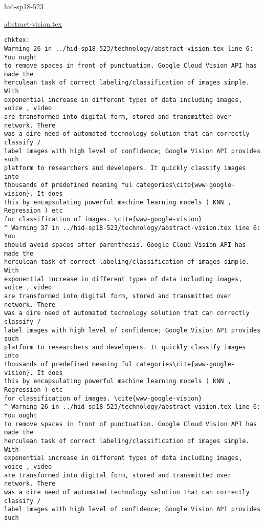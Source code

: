 \begin{IU}

hid-sp18-523

\href{https://github.com/cloudmesh-community/hid-sp18-523/blob/master//technology/abstract-vision.tex}{abstract-vision.tex}

\begin{tiny}
\begin{verbatim}
chktex:
Warning 26 in ../hid-sp18-523/technology/abstract-vision.tex line 6: You ought
to remove spaces in front of punctuation. Google Cloud Vision API has made the
herculean task of correct labeling/classification of images simple. With
exponential increase in different types of data including images, voice , video
are transformed into digital form, stored and transmitted over network. There
was a dire need of automated technology solution that can correctly classify /
label images with high level of confidence; Google Vision API provides such
platform to researchers and developers. It quickly classify images into
thousands of predefined meaning ful categories\cite{www-google-vision}. It does
this by encapsulating powerful machine learning models ( KNN , Regression ) etc
for classification of images. \cite{www-google-vision}
^ Warning 37 in ../hid-sp18-523/technology/abstract-vision.tex line 6: You
should avoid spaces after parenthesis. Google Cloud Vision API has made the
herculean task of correct labeling/classification of images simple. With
exponential increase in different types of data including images, voice , video
are transformed into digital form, stored and transmitted over network. There
was a dire need of automated technology solution that can correctly classify /
label images with high level of confidence; Google Vision API provides such
platform to researchers and developers. It quickly classify images into
thousands of predefined meaning ful categories\cite{www-google-vision}. It does
this by encapsulating powerful machine learning models ( KNN , Regression ) etc
for classification of images. \cite{www-google-vision}
^ Warning 26 in ../hid-sp18-523/technology/abstract-vision.tex line 6: You ought
to remove spaces in front of punctuation. Google Cloud Vision API has made the
herculean task of correct labeling/classification of images simple. With
exponential increase in different types of data including images, voice , video
are transformed into digital form, stored and transmitted over network. There
was a dire need of automated technology solution that can correctly classify /
label images with high level of confidence; Google Vision API provides such

\end{verbatim}
\end{tiny}
\end{IU}
